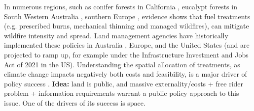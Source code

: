 In numerous regions, such as conifer forests in California \citep{Vaillant2009, Kalies2016, low_shaded_2023}, eucalypt forests in South Western Australia \citep{burrows2013, boer_long-term_2009, Florec2020}, southern Europe \citep{Fernandes2013}, evidence shows that fuel treatments (e.g. prescribed burns, mechanical thinning and managed wildfires), can mitigate wildfire intensity and spread. Land management agencies have historically implemented these policies in Australia \citep{burrows2013}, Europe, and the United States (and are projected to ramp up, for example under the Infrastructure Investment and Jobs Act of 2021 in the US). Understanding the spatial allocation of treatments, as climate change impacts negatively both costs and feasibility, is a major driver of policy success \citep{Williams2017,Florec2020}. 
\textbf{Idea:} land is public, and massive externality/costs + free rider problem + information requirements warrant a public policy approach to this issue. One of the drivers of its success is space.

